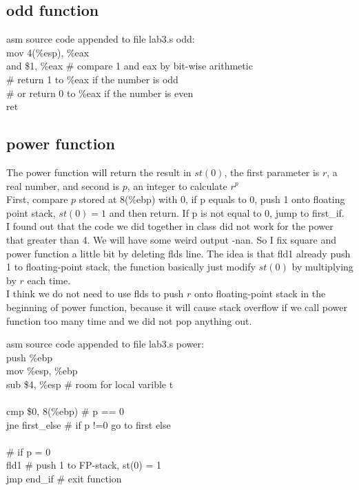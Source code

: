 \documentclass{article}
\begin{document}
\subsection{odd function}
\begin{GFT}{asm source code appended to file lab3.s}
\+odd:\\
\+  mov 4(\%esp), \%eax\\
\+  and \$1, \%eax			\# compare 1 and eax by bit-wise arithmetic\\
\+				\# return 1 to \%eax if the number is odd\\
\+				\# or return 0 to \%eax if the number is even\\
\+  ret\\
\end{GFT}
\clearpage\subsection{power function}
The power function will return the result in $st(0)$, the first parameter is $r$, a real number, and second is $p$, an integer to calculate $r^p$ 
\\
First, compare $p$ stored at 8(\%ebp) with 0, if p equals to 0, push 1 onto floating point stack, $st(0) = 1$ and then return. If p is not equal to 0, jump to first\_if.
\\
I found out that the code we did together in class did not work for the power that greater than 4. We will have some weird output -nan. So I fix square and power function a little bit by deleting flds line. The idea is that fld1 already push 1 to floating-point stack, the function basically just modify $st(0)$ by multiplying by $r$ each time.
\\
I think we do not need to use flds to push $r$ onto floating-point stack in the beginning of power function, because it will cause stack overflow if we call power function too many time and we did not pop anything out.
\begin{GFT}{asm source code appended to file lab3.s}
\+power:\\
\+  push \%ebp\\
\+  mov \%esp, \%ebp\\
\+  sub \$4, \%esp			\# room for local varible t\\
\+  \\
\+  cmp \$0, 8(\%ebp)		\# p == 0\\
\+  jne first\_else		\# if p !=0 go to first else\\
\+\\
\+  \# if p = 0\\
\+  fld1				\# push 1 to FP-stack, st(0) = 1\\
\+  jmp end\_if			\# exit function\\
\end{GFT}
\end{document}

